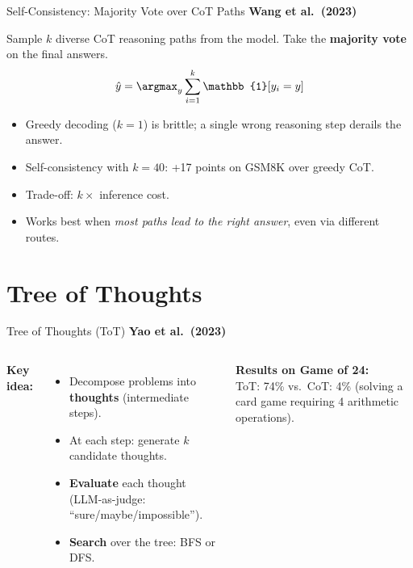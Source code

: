 \documentclass[aspectratio=169,10pt]{beamer}
\begin{document}
\begin{frame}{Self-Consistency: Majority Vote over CoT Paths}
  \textbf{Wang et al.\ (2023)}~\cite{wang2023selfconsistency}
  \vspace{0.4em}
  \begin{tcolorbox}[hitbox, title=Self-Consistency]
    Sample $k$ diverse CoT reasoning paths from the model.
    Take the \textbf{majority vote} on the final answers.
    \[
      \hat{y} = \argmax_y \sum_{i=1}^k \mathbb{1}[y_i = y]
    \]
  \end{tcolorbox}
  \vspace{0.4em}
  \begin{itemize}
    \item Greedy decoding ($k=1$) is brittle; a single wrong reasoning step derails the answer.
    \item Self-consistency with $k=40$: +17 points on GSM8K over greedy CoT.
    \item Trade-off: $k\times$ inference cost.
    \item Works best when \emph{most paths lead to the right answer}, even via different routes.
  \end{itemize}
\end{frame}

\section{Tree of Thoughts}

\begin{frame}{Tree of Thoughts (ToT)}
  \textbf{Yao et al.\ (2023)}~\cite{yao2023tree}
  \vspace{0.4em}
  \begin{columns}[T]
      \textbf{Key idea:}
      \begin{itemize}
        \item Decompose problems into \textbf{thoughts} (intermediate steps).
        \item At each step: generate $k$ candidate thoughts.
        \item \textbf{Evaluate} each thought (LLM-as-judge: ``sure/maybe/impossible'').
        \item \textbf{Search} over the tree: BFS or DFS.
      \end{itemize}
      \vspace{0.4em}
      \textbf{Results on Game of 24:}\\
      ToT: 74\% vs.\ CoT: 4\% (solving a card game requiring 4 arithmetic operations).
  \end{columns}
\end{frame}
\end{document}
